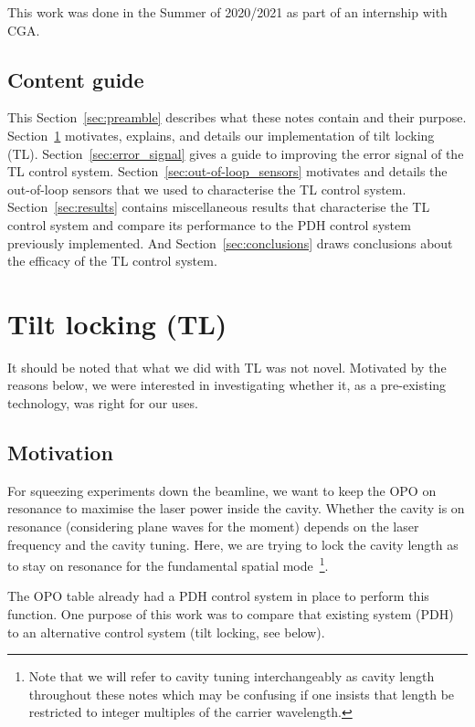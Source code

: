 \documentclass[aps,pra,superscriptaddress,reprint,nofootinbib]{revtex4-1}
\begin{document}
This work was done in the Summer of 2020/2021 as part of an internship with CGA.

\subsection{Content guide}

This Section~\ref{sec:preamble} describes what these notes contain and their purpose.
Section~\ref{sec:TL} motivates, explains, and details our implementation of tilt locking (TL).
Section~\ref{sec:error_signal} gives a guide to improving the error signal of the TL control system.
Section~\ref{sec:out-of-loop_sensors} motivates and details the out-of-loop sensors that we used to characterise the TL control system.
Section~\ref{sec:results} contains miscellaneous results that characterise the TL control system and compare its performance to the PDH control system previously implemented.
And Section~\ref{sec:conclusions} draws conclusions about the efficacy of the TL control system.


\section{Tilt locking (TL)}
\label{sec:TL}

It should be noted that what we did with TL was not novel. Motivated by the reasons below, we were interested in investigating whether it, as a pre-existing technology, was right for our uses.

\subsection{Motivation}

For squeezing experiments down the beamline, we want to keep the OPO on resonance to maximise the laser power inside the cavity. Whether the cavity is on resonance (considering plane waves for the moment) depends on the laser frequency and the cavity tuning. Here, we are trying to lock the cavity length as to stay on resonance for the fundamental spatial mode~\footnote{Note that we will refer to cavity tuning interchangeably as cavity length throughout these notes which may be confusing if one insists that length be restricted to integer multiples of the carrier wavelength.}.


The OPO table already had a PDH control system in place to perform this function. One purpose of this work was to compare that existing system (PDH) to an alternative control system (tilt locking, see below). 
\end{document}
